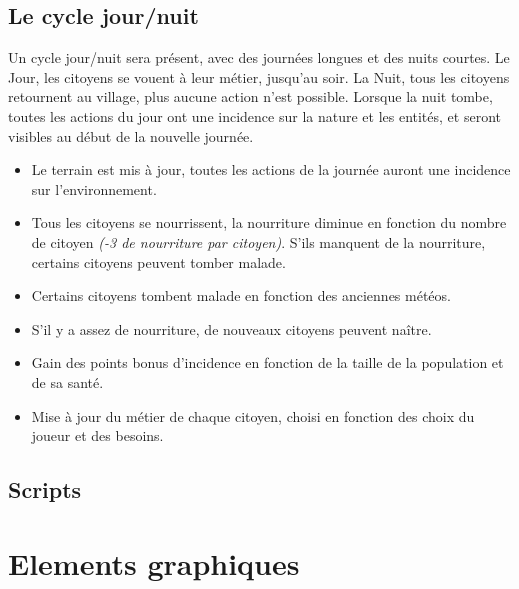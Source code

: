 \documentclass[a4paper]{article}
\newcommand{\alinea}{\hspace*{0.5cm}}
\begin{document}
	\subsection{Le cycle jour/nuit}
	  \label{Cycle}
	  \alinea Un cycle jour/nuit sera présent, avec des journées longues et des nuits courtes. Le Jour, les citoyens se vouent à leur métier, jusqu'au soir. La Nuit, tous les citoyens retournent au village, plus aucune action n'est possible. Lorsque la nuit tombe, toutes les actions du jour ont une incidence sur la nature et les entités, et seront visibles au début de la nouvelle journée.
	  \begin{itemize} \small
		\item Le terrain est mis à jour, toutes les actions de la journée auront une incidence sur l'environnement.
		\item Tous les citoyens se nourrissent, la nourriture diminue en fonction du nombre de citoyen \textit{(-3 de nourriture par citoyen)}. S'ils manquent de la nourriture, certains citoyens peuvent tomber malade.
		\item Certains citoyens tombent malade en fonction des anciennes météos.
		\item S'il y a assez de nourriture, de nouveaux citoyens peuvent naître.
		\item Gain des points bonus d'incidence en fonction de la taille de la population et de sa santé.
		\item Mise à jour du métier de chaque citoyen, choisi en fonction des choix du joueur et des besoins.
	  \end{itemize} \normalsize

      \subsection{Scripts}
      
    \section{Elements graphiques}
\end{document}
